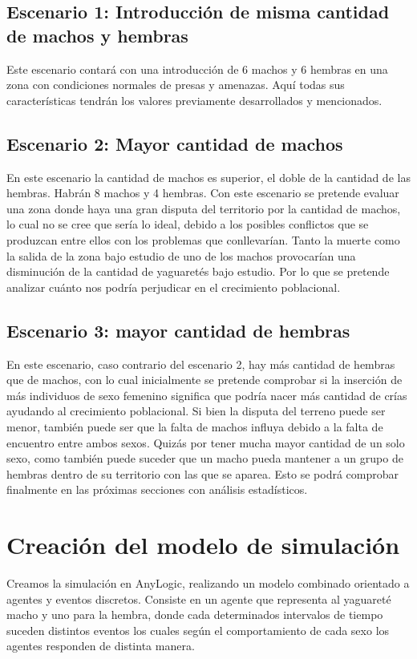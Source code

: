     \subsection{Escenario 1: Introducción de misma cantidad de machos y hembras}
        Este escenario contará con una introducción de 6 machos y 6 hembras en una zona con condiciones normales de presas y amenazas. Aquí todas sus características tendrán los valores previamente desarrollados y mencionados.

    \subsection{Escenario 2: Mayor cantidad de machos}
      En este escenario la cantidad de machos es superior, el doble de la cantidad de las hembras. Habrán 8 machos y 4 hembras. Con este escenario se pretende evaluar una zona donde haya una gran disputa del territorio por la cantidad de machos, lo cual no se cree que sería lo ideal, debido a los posibles conflictos que se produzcan entre ellos con los problemas que conllevarían. Tanto la muerte como la salida de la zona bajo estudio de uno de los machos provocarían una disminución de la cantidad de yaguaretés bajo estudio. Por lo que se pretende analizar cuánto nos podría perjudicar en el crecimiento poblacional.

    \subsection{Escenario 3: mayor cantidad de hembras}
      En este escenario, caso contrario del escenario 2, hay más cantidad de hembras que de machos, con lo cual inicialmente se pretende comprobar si la inserción de más individuos de sexo femenino significa que podría nacer más cantidad de crías ayudando al crecimiento poblacional. Si bien la disputa del terreno puede ser menor, también puede ser que la falta de machos influya debido a la falta de encuentro entre ambos sexos. Quizás por tener mucha mayor cantidad de un solo sexo, como también puede suceder que un macho pueda mantener a un grupo de hembras dentro de su territorio con las que se aparea. Esto se podrá comprobar finalmente en las próximas secciones con análisis estadísticos.

\section{Creación del modelo de simulación}
    Creamos la simulación en AnyLogic, realizando un modelo combinado orientado a agentes y eventos discretos. Consiste en un agente que representa al yaguareté macho y uno para la hembra, donde cada determinados intervalos de tiempo suceden distintos eventos los cuales según el comportamiento de cada sexo los agentes responden de distinta manera.
    
